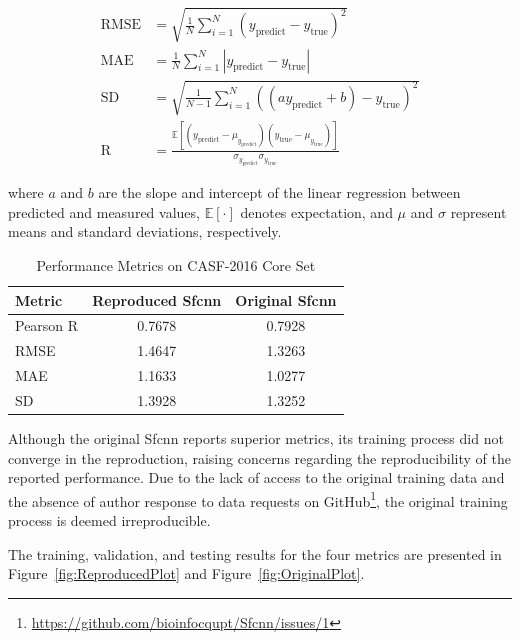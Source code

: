 \documentclass[unnumsec,webpdf,contemporary,large]{oup-authoring-template}
\theoremstyle{thmstyleone}%
\theoremstyle{thmstyletwo}%
\theoremstyle{thmstylethree}%
\begin{document}
\begin{align*}
\mathrm{RMSE} &= \sqrt{\frac{1}{N} \sum_{i=1}^{N} (y_{\text{predict}} - y_{\text{true}})^2} \\
\mathrm{MAE} &= \frac{1}{N} \sum_{i=1}^{N} |y_{\text{predict}} - y_{\text{true}}| \\
\mathrm{SD} &= \sqrt{\frac{1}{N-1} \sum_{i=1}^{N} ((a y_{\text{predict}} + b) - y_{\text{true}})^2} \\
\mathrm{R} &= \frac{\mathbb{E}[(y_{\text{predict}} - \mu_{y_{\text{predict}}})(y_{\text{true}} - \mu_{y_{\text{true}}})]}{\sigma_{y_{\text{predict}}} \sigma_{y_{\text{true}}}}
\end{align*}

where $a$ and $b$ are the slope and intercept of the linear regression between predicted and measured values, $\mathbb{E}[\cdot]$ denotes expectation, and $\mu$ and $\sigma$ represent means and standard deviations, respectively.

\begin{table}[H]
\centering
\caption{Performance Metrics on CASF-2016 Core Set}
\label{tab:metrics}
\begin{tabular}{lcc}
\toprule
Metric & Reproduced Sfcnn & Original Sfcnn \\
\midrule
Pearson R & 0.7678 & 0.7928 \\
RMSE & 1.4647 & 1.3263 \\
MAE & 1.1633 & 1.0277 \\
SD & 1.3928 & 1.3252 \\
\bottomrule
\end{tabular}
\end{table}

Although the original Sfcnn reports superior metrics, its training process did not converge in the reproduction, raising concerns regarding the reproducibility of the reported performance. 
Due to the lack of access to the original training data and the absence of author response to data requests on GitHub\footnote{\url{https://github.com/bioinfocqupt/Sfcnn/issues/1}}, the original training process is deemed irreproducible.

The training, validation, and testing results for the four metrics are presented in Figure~\ref{fig:ReproducedPlot} and Figure~\ref{fig:OriginalPlot}.
\end{document}
